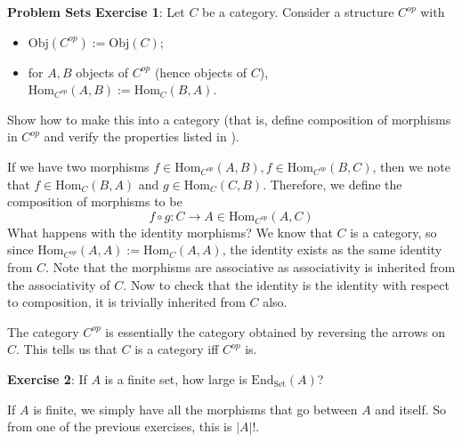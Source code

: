 \documentclass{report}
\begin{document}
\begin{exercises}{\textbf{Problem Sets}}
    \textbf{Exercise 1}: Let $C$ be a category. Consider a structure $C^{op}$ with 
        \begin{itemize}
            \item $\text{Obj}(C^{op}) := \text{Obj}(C)$;

            \item for $A, B$ objects of $C^{op}$ (hence objects of $C$), $\text{Hom}_{C^{op}}(A, B) := \text{Hom}_{C}(B, A)$. 
        \end{itemize}
        Show how to make this into a category (that is, define composition of morphisms in $C^{op}$ and verify the properties listed in ).
            \begin{answer}
                If we have two morphisms $f \in \text{Hom}_{C^{op}}(A, B), f \in \text{Hom}_{C^{op}}(B, C)$, then we note that $f \in \text{Hom}_{C}(B, A)$ and $g \in \text{Hom}_{C}(C, B)$. Therefore, we define the composition of morphisms to be
                \begin{equation*}
                    f \circ g : C \rightarrow A \in \text{Hom}_{C^{op}}(A, C)
                \end{equation*}
                What happens with the identity morphisms? We know that $C$ is a category, so since $\text{Hom}_{C^{op}}(A, A) := \text{Hom}_{C}(A, A)$, the identity exists as the same identity from $C$. Note that the morphisms are associative as associativity is inherited from the associativity of $C$. Now to check that the identity is the identity with respect to composition, it is trivially inherited from $C$ also.
            \end{answer}
        The category $C^{op}$ is essentially the category obtained by reversing the arrows on $C$. This tells us that $C$ is a category iff $C^{op}$ is.

    \textbf{Exercise 2}: If $A$ is a finite set, how large is $\text{End}_{\text{Set}}(A)$?
        \begin{answer}
            If $A$ is finite, we simply have all the morphisms that go between $A$ and itself. So from one of the previous exercises, this is $\lvert A \rvert!$. 
        \end{answer}


\end{exercises}
\end{document}
